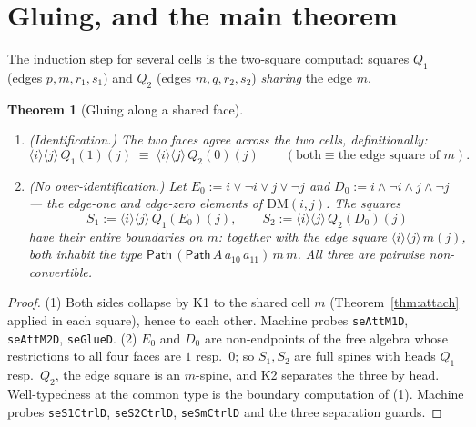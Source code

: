\documentclass[11pt]{amsart}
\newtheorem{thm}{Theorem}[section]
\theoremstyle{definition}
\newcommand{\DM}[1]{\mathrm{DM}(#1)}
\newcommand{\aconv}{\equiv}
\newcommand{\Path}{\mathsf{Path}}
\begin{document}
\section{Gluing, and the main theorem}
\label{sec:main}

The induction step for several cells is the two-square computad:
squares $Q_1$ (edges $p, m, r_1, s_1$) and $Q_2$ (edges
$m, q, r_2, s_2$) \emph{sharing} the edge $m$.

\begin{thm}[Gluing along a shared face]\label{thm:glue}
  \begin{enumerate}
  \item (Identification.)  The two faces agree across the two
    cells, definitionally:
    \[
      \langle i \rangle \langle j \rangle\, Q_1(1)(j)
      \;\aconv\;
      \langle i \rangle \langle j \rangle\, Q_2(0)(j)
      \qquad (\text{both} \aconv \text{the edge square of } m).
    \]
  \item (No over-identification.)  Let
    $E_0 := i \vee \neg i \vee j \vee \neg j$ and
    $D_0 := i \wedge \neg i \wedge j \wedge \neg j$ --- the
    edge-one and edge-zero elements of $\DM{i,j}$.  The squares
    \[
      S_1 := \langle i \rangle \langle j \rangle\, Q_1(E_0)(j),
      \qquad
      S_2 := \langle i \rangle \langle j \rangle\, Q_2(D_0)(j)
    \]
    have their \emph{entire boundaries} on $m$: together with
    the edge square $\langle i \rangle \langle j \rangle\, m(j)$,
    both inhabit the type
    $\Path\,(\Path\,A\,a_{10}\,a_{11})\,m\,m$.  All three are
    pairwise non-convertible.
  \end{enumerate}
\end{thm}
\begin{proof}
  (1) Both sides collapse by K1 to the shared cell $m$
  (Theorem~\ref{thm:attach} applied in each square), hence to each
  other.  Machine probes \texttt{seAttM1D}, \texttt{seAttM2D},
  \texttt{seGlueD}.  (2) $E_0$ and $D_0$ are non-endpoints of the
  free algebra whose restrictions to all four faces are $1$
  resp.\ $0$; so $S_1, S_2$ are full spines with heads $Q_1$
  resp.\ $Q_2$, the edge square is an $m$-spine, and K2 separates
  the three by head.  Well-typedness at the common type is the
  boundary computation of (1).  Machine probes
  \texttt{seS1CtrlD}, \texttt{seS2CtrlD}, \texttt{seSmCtrlD} and
  the three separation guards.
\end{proof}
\end{document}
